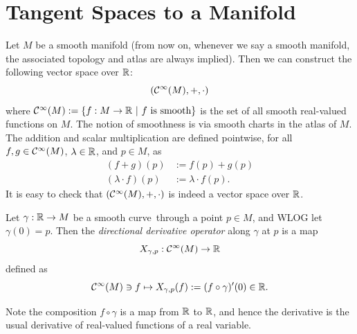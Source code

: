 
\section{Tangent Spaces to a Manifold}

Let \(M\) be a smooth manifold (from now on, whenever we say a smooth manifold, the associated topology and atlas are always implied). Then we can construct the following vector space over \(\mathbb R\):
\begin{equation}
	\qty(\mathcal C^\infty(M), +, \cdot)
\end{equation}
where \(\mathcal C^\infty(M) := \qty{f : M \to \mathbb R\ \middle|\ f \text{ is smooth}}\) is the set of all smooth real-valued functions on \(M\). The notion of smoothness is via smooth charts in the atlas of \(M\). The addition and scalar multiplication are defined pointwise, for all \(f, g \in \mathcal C^\infty(M)\), \(\lambda \in \mathbb R\), and \(p \in M\), as
\begin{align}
	(f + g)(p)           & := f(p) + g(p)         \\
	(\lambda \cdot f)(p) & := \lambda \cdot f(p).
\end{align}
It is easy to check that \(\qty(\mathcal C^\infty(M), +, \cdot)\) is indeed a vector space over \(\mathbb R\).

\begin{definition}
	Let \(\gamma: \mathbb R \to M\) be a smooth curve\footnotemark\ through a point \(p \in M\), and WLOG let \(\gamma(0) = p\). Then the \emph{directional derivative operator} along \(\gamma\) at \(p\) is a map
	\begin{equation}
		X_{\gamma, p} : \mathcal C^\infty(M) \to \mathbb R
	\end{equation}
	defined as
	\begin{equation}
		\mathcal C^\infty(M) \ni f \mapsto X_{\gamma, p}(f) := (f \circ \gamma)'(0) \in \mathbb R.
	\end{equation}
\end{definition}
Note the composition \(f \circ \gamma\) is a map from \(\mathbb R\) to \(\mathbb R\), and hence the derivative is the usual derivative of real-valued functions of a real variable.

